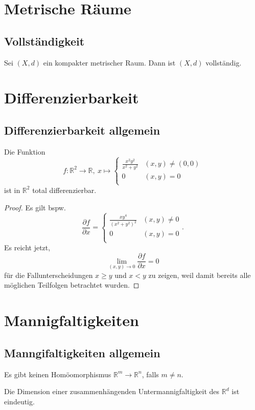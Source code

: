 \documentclass[11pt,twoside]{memoir}
\begin{document}
	
\frontmatter
\maketitle
\begin{KeepFromToc}
	\tableofcontents
\end{KeepFromToc}

\mainmatter
\chapter{Metrische Räume}
\section{Vollständigkeit}
\begin{prop}
	Sei $(X,d)$ ein kompakter metrischer Raum. Dann ist $(X,d)$ vollständig.
\end{prop}
\chapter{Differenzierbarkeit}
\section{Differenzierbarkeit allgemein}
\begin{bsp}
	Die Funktion 
	\[ f:\mathbb{R}^2\to \mathbb{R},~x\mapsto \begin{cases} \frac{x^2y^2}{x^2+y^2}&(x,y)\neq(0,0)\\0&(x,y)=0\\\end{cases}\]
	ist in $\mathbb{R}^2$ total differenzierbar.
\end{bsp}
\begin{proof}
	Es gilt bspw.
	\[\frac{\partial f}{\partial x} = \begin{cases}\frac{xy^4}{(x^2+y^2)^2}&(x,y)\neq 0\\0&(x,y)=0\\\end{cases}.\]
	Es reicht jetzt, 
	\[
	\lim_{(x,y)\to 0} \frac{\partial f}{\partial x} =0
	\]
	für die Fallunterscheidungen $x\geq y$ und $x<y$ zu zeigen, weil damit bereits alle möglichen Teilfolgen betrachtet wurden.
\end{proof}

\chapter{Mannigfaltigkeiten}
\section{Manngifaltigkeiten allgemein}
\begin{prop}
	Es gibt keinen Homöomorphismus $\mathbb{R}^m\to \mathbb{R}^n$, falls $m\neq n$.
\end{prop}
\begin{cor}
	Die Dimension einer zusammenhängenden Untermannigfaltigkeit des $\mathbb{R}^d$ ist eindeutig.
\end{cor}
\appendix
\backmatter
\printbibliography[heading = bibintoc]
\printindex
\end{document}
